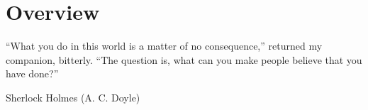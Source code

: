 \documentclass[a4paper,12pt,%
onecolumn,oneside,%
british%
]{memoir}
\providecommand{\href}[2]{#2}
\renewcommand*{\|}[1][]{\nonscript\:#1\vert\nonscript\:\mathopen{}}
\newcommand*{\furl}[2]{\href{#1}{#2}\pagenote{\url{#1}}}
\begin{document}
%
%
%
%
%
%
%


\printpagenotes*
\clearpage
\chapter{Overview}
\label{cha:overview}

\epigraph{\enquote{What you do in this world is a matter of no consequence,} returned my companion, bitterly. \enquote{The question is, what can you make people believe that you have done?\textellipsis}}{Sherlock Holmes (A. C. Doyle) \cites*{doyle1887}}
\end{document}
